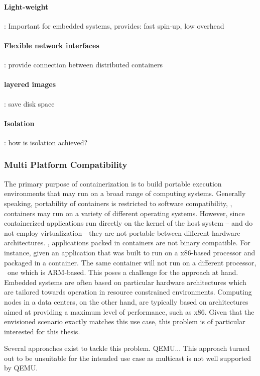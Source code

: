 \paragraph{Light-weight}: Important for embedded systems, provides: fast spin-up, low overhead

\paragraph{Flexible network interfaces}: provide connection between distributed containers

\paragraph{layered images}: save disk space

\paragraph{Isolation}: how is isolation achieved?


\subsubsection{Multi Platform Compatibility} 
The primary purpose of containerization is to build portable execution environments that may run on a broad range of computing systems. Generally speaking, portability of containers is restricted to software compatibility, \ie , containers may run on a variety of different operating systems. However, since containerized applications run directly on the kernel of the host system -- and do not employ virtualization---they are not portable between different hardware architectures. \Ie , applications packed in containers are not binary compatible. For instance, given an application that was built to run on a x86-based processor and packaged in a container. The same container will not run on a different processor, \eg\ one which is ARM-based. This poses a challenge for the approach at hand. Embedded systems are often based on particular hardware architectures which are tailored towards operation in resource constrained environments. Computing nodes in a data centers, on the other hand, are typically based on architectures aimed at providing a maximum level of performance, such as x86. Given that the envisioned scenario exactly matches this use case, this problem is of particular interested for this thesis.

Several approaches exist to tackle this problem. QEMU... This approach turned out to be unsuitable for the intended use case as multicast is not well supported by QEMU.


